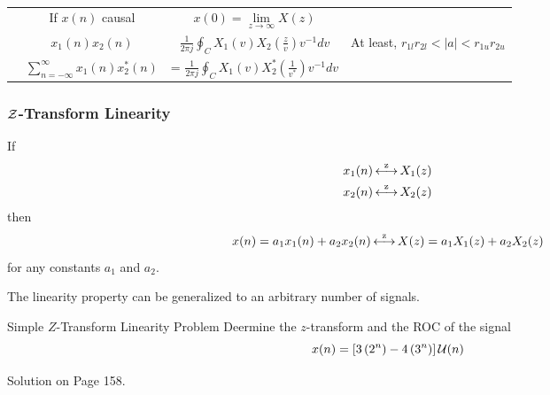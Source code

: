 \begin{table}[h!]
\begin{tabular}{p{4cm}ccp{5cm}}
    \nameref{subsubsec:Initial Value Theorem for Z-Transform} & If $x(n)$ causal & $x(0) = \lim\limits_{z \to \infty} X(z)$ & \\
    \nameref{subsubsec:Z-Transform 2 Sequence Multiplication} & $x_{1}(n)x_{2}(n)$ & $\frac{1}{2 \pi j} \oint_{C} X_{1}(v)X_{2}(\frac{z}{v}) v^{-1} dv$ & At least, $r_{1l}r_{2l} < \lvert a \rvert < r_{1u}r_{2u}$ \\
    \nameref{subsubsec:Parsevals Relation for Z-Transform} & $\sum\limits_{n=-\infty}^{\infty} x_{1}(n)x_{2}^{*}(n)$ &= $\frac{1}{2 \pi j} \oint_{C} X_{1}(v)X_{2}^{*}(\frac{1}{v^{*}})v^{-1} dv$ & \\
    \bottomrule
  \end{tabular}
  \caption{}
  \label{tab:Z-Transform Properties}
\end{table}

\subsubsection{\texorpdfstring{$\operatorname{\mathcal{Z}}$-Transform}{Z-Transform} Linearity}\label{subsubsec:Z-Transform Linearity}
If
\begin{equation*}
  \begin{aligned}
    x_{1}(n) &\operatorname{\overset{z}{\longleftrightarrow}} X_{1}(z) \\
    x_{2}(n) &\operatorname{\overset{z}{\longleftrightarrow}} X_{2}(z) \\
  \end{aligned}
\end{equation*}
then
\begin{equation}\label{eq:Z-Transform Linearity}
  x(n) = a_{1}x_{1}(n) + a_{2}x_{2}(n) \operatorname{\overset{z}{\longleftrightarrow}} X(z) = a_{1}X_{1}(z) + a_{2}X_{2}(z)
\end{equation}
for any constants $a_{1}$ and $a_{2}$.

The linearity property can be generalized to an arbitrary number of signals.

\begin{example}[Example 3.2.1]{Simple \texorpdfstring{$Z$-Transform}{Z-Transform} Linearity Problem}
  Deermine the $z$-transform and the ROC of the signal
  \begin{equation*}
    x(n) = \left[ 3 \left( 2^{n} \right) - 4 \left( 3^{n} \right) \right] \operatorname{\mathcal{U}}(n)
  \end{equation*}

  \tcblower

  Solution on Page 158.
\end{example}

